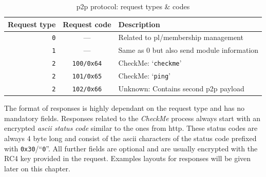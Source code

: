 \begin{table}
    \centering
    \begin{tabular}{rcl}
        \toprule
        Request type &
        Request code &
        Description \\
        \midrule

        \texttt{0} &
        --- &
        Related to \gls{pl}/membership management \\

        \texttt{1}  &
        --- &
        Same as 0 but also send module information \\
        \midrule

        \texttt{2} &
        \texttt{100/0x64} &
        CheckMe: `\lstinline|checkme|'\\

        \texttt{2} &
        \texttt{101/0x65} &
        CheckMe: `\lstinline|ping|' \\

        \texttt{2} &
        \texttt{102/0x66} &
        Unknown: Contains second \gls{p2p} payload \\
        \bottomrule
    \end{tabular}
    \caption{\gls{p2p} protocol: request types \& codes\label{tab:Main_module::P2P::RequestTypesAndCodes}}
\end{table}

The format of responses is highly dependant on the request type and has no mandatory fields.
Responses related to the \emph{CheckMe} process always start with an encrypted \emph{\gls{ascii} status code} similar to the ones from \gls{http}.
These status codes are always 4 byte long and consist of the \gls{ascii} characters of the status code prefixed with \lstinline|0x30|/``\lstinline|0|''.
All further fields are optional and are usually encrypted with the RC4 key provided in the request.
Examples layouts for responses will be given later on this chapter.

